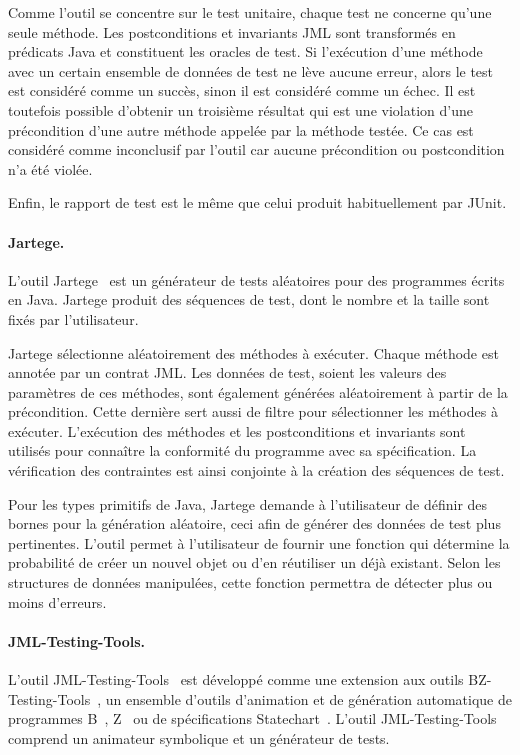 Comme l'outil se concentre sur le test unitaire, chaque test ne concerne qu'une
seule méthode. Les postconditions et invariants JML sont transformés en
prédicats Java et constituent les oracles de test. Si l'exécution d'une méthode
avec un certain ensemble de données de test ne lève aucune erreur, alors le
test est considéré comme un succès, sinon il est considéré comme un échec. Il
est toutefois possible d'obtenir un troisième résultat qui est une violation
d'une précondition d'une autre méthode appelée par la méthode testée.  Ce cas
est considéré comme inconclusif par l'outil car aucune précondition ou
postcondition n'a été violée.

Enfin, le rapport de test est le même que celui produit habituellement par
JUnit.

\paragraph{Jartege.} L'outil Jartege~ est un générateur de tests
aléatoires pour des programmes écrits en Java. Jartege produit des séquences de
test, dont le nombre et la taille sont fixés par l'utilisateur.

Jartege sélectionne aléatoirement des méthodes à exécuter. Chaque méthode est
annotée par un contrat JML. Les données de test, soient les valeurs des
paramètres de ces méthodes, sont également générées aléatoirement à partir de la
précondition. Cette dernière sert aussi de filtre pour sélectionner les méthodes
à exécuter. L'exécution des méthodes et les postconditions et invariants sont
utilisés pour connaître la conformité du programme avec sa spécification. La
vérification des contraintes est ainsi conjointe à la création des séquences de
test.

Pour les types primitifs de Java, Jartege demande à l'utilisateur de définir des
bornes pour la génération aléatoire, ceci afin de générer des données de test
plus pertinentes. L'outil permet à l'utilisateur de fournir une fonction qui
détermine la probabilité de créer un nouvel objet ou d'en réutiliser un déjà
existant. Selon les structures de données manipulées, cette fonction permettra
de détecter plus ou moins d'erreurs.

\paragraph{JML-Testing-Tools.} L'outil JML-Testing-Tools~ est développé comme une extension aux outils
BZ-Testing-Tools~, un ensemble d'outils d'animation et de
génération automatique de programmes B~, Z~ ou
de spécifications Statechart~. L'outil JML-Testing-Tools comprend
un animateur symbolique et un générateur de tests.

